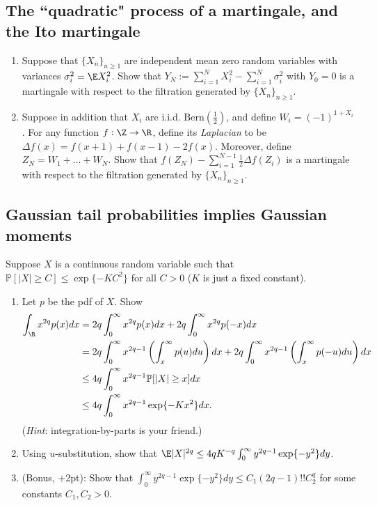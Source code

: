 \documentclass[12pt,reqno]{amsart}
\theoremstyle{definition}
\theoremstyle{remark}
\numberwithin{equation}{section}
\begin{document}
\subsection{The ``quadratic" process of a martingale, and the Ito martingale}
\begin{enumerate}
\item Suppose that $\{X_{n}\}_{n\geq1}$ are independent mean zero random variables with variances $\sigma_{i}^{2}=\E X_{i}^{2}$. Show that $Y_{N}:=\sum_{i=1}^{N}X_{i}^{2}-\sum_{i=1}^{N}\sigma_{i}^{2}$ with $Y_{0}=0$ is a martingale with respect to the filtration generated by $\{X_{n}\}_{n\geq1}$.
\item Suppose in addition that $X_{i}$ are i.i.d. $\mathrm{Bern}(\frac12)$, and define $W_{i}=(-1)^{1+X_{i}}$. For any function $f:\Z\to\R$, define its \emph{Laplacian} to be $\Delta f(x)=f(x+1)+f(x-1)-2f(x)$. Moreover, define $Z_{N}=W_{1}+\ldots+W_{N}$. Show that $f(Z_{N})-\sum_{i=1}^{N-1}\frac12\Delta f(Z_{i})$ is a martingale with respect to the filtration generated by $\{X_{n}\}_{n\geq1}$.
\end{enumerate}
\subsection{Gaussian tail probabilities implies Gaussian moments}
Suppose $X$ is a continuous random variable such that $\mathbb{P}[|X|\geq C]\leq\exp\{-KC^{2}\}$ for all $C>0$ ($K$ is just a fixed constant). 
\begin{enumerate}
\item Let $p$ be the pdf of $X$. Show
%
\begin{align*}
\int_{\R}x^{2q}p(x)dx&=2q\int_{0}^{\infty}x^{2q}p(x)dx+2q\int_{0}^{\infty}x^{2q}p(-x)dx\\
&=2q\int_{0}^{\infty}x^{2q-1}\left(\int_{x}^{\infty}p(u)du\right)dx+2q\int_{0}^{\infty}x^{2q-1}\left(\int_{x}^{\infty}p(-u)du\right)dx\\
&\leq 4q\int_{0}^{\infty}x^{2q-1}\mathbb{P}[|X|\geq x]dx\\
&\leq 4q\int_{0}^{\infty}x^{2q-1}\exp\{-Kx^{2}\}dx.
\end{align*}
%
(\emph{Hint}: integration-by-parts is your friend.)
\item Using $u$-substitution, show that $\E|X|^{2q}\leq 4qK^{-q}\int_{0}^{\infty}y^{2q-1}\exp\{-y^{2}\}dy$.
\item (Bonus, +2pt): Show that $\int_{0}^{\infty}y^{2q-1}\exp\{-y^{2}\}dy\leq C_{1}(2q-1)!!C_{2}^{q}$ for some constants $C_{1},C_{2}>0$.
\end{enumerate}
\end{document}
